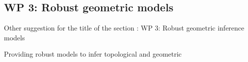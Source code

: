 \subsection*{WP 3:  Robust geometric models} 

Other suggestion for the title of the section : WP 3:  Robust geometric inference models


Providing robust models to infer topological and geometric 




